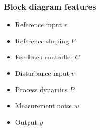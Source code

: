 \documentclass{beamer-control}
\begin{document}
\begin{frame}
\frametitle{Block diagram features}
\begin{itemize}
\item Reference input $r$
\item Reference shaping $F$
\item Feedback controller $C$
\item Disturbance input $v$
\item Process dynamics $P$
\item Measurement noise $w$
\item Output $y$
\end{itemize}
\end{frame}



\SUMMARYFRAME
\FINALE
\end{document}
